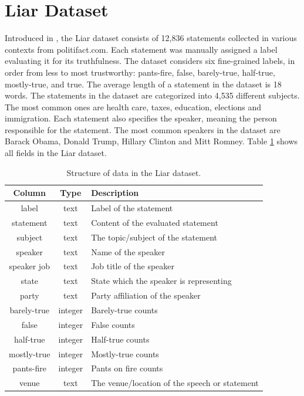 \section{Liar Dataset}
\label{datasets:liar}
Introduced in \cite{liar}, the Liar dataset consists of 12,836 statements collected in various contexts from politifact.com. Each statement was manually assigned a label evaluating it for its truthfulness. The dataset considers six fine-grained labels, in order from less to most trustworthy: pants-fire, false, barely-true, half-true, mostly-true, and true. The average length of a statement in the dataset is 18 words.
The statements in the dataset are categorized into 4,535 different subjects. The most common ones are health care, taxes, education, elections and immigration. Each statement also specifies the speaker, meaning the person responsible for the statement. The most common speakers in the dataset are Barack Obama, Donald Trump, Hillary Clinton and Mitt Romney. Table \ref{tab:liar_columns} shows all fields in the Liar dataset.
\begin{table}[h]
    \centering
    \begin{tabular}{c|c|l}
    \textbf{Column} & \cellcolor[HTML]{FFFFFF}\textbf{Type} & \cellcolor[HTML]{FFFFFF}\textbf{Description}  \\ \hline
    label       & text    & Label of the statement                  \\
    statement   & text    & Content of the evaluated statement      \\
    subject     & text    & The topic/subject of the statement      \\
    speaker     & text    & Name of the speaker                     \\
    speaker job & text    & Job title of the speaker                \\
    state       & text    & State which the speaker is representing \\
    party       & text    & Party affiliation of the speaker        \\
    barely-true & integer & Barely-true counts                      \\
    false       & integer & False counts                            \\
    half-true   & integer & Half-true counts                        \\
    mostly-true & integer & Mostly-true counts                      \\
    pants-fire  & integer & Pants on fire counts                    \\
    venue           & text                                  & The venue/location of the speech or statement
    \end{tabular}
    \caption{Structure of data in the Liar dataset.}
    \label{tab:liar_columns}
\end{table}
